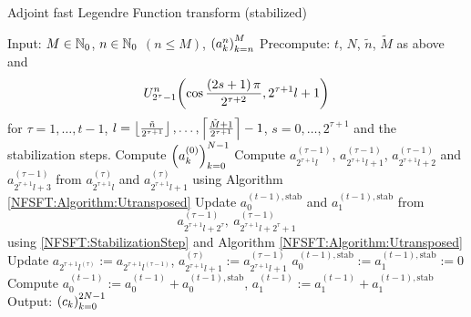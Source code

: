 \begin{algorithm}[tb]
  \caption{Adjoint fast Legendre Function transform (stabilized)}
  \label{NFSFT:Algorithm:adjointFLFT_stab}    
  \begin{algorithmic}
    \STATE Input:  $M \in \mathbb{N}_{0}$, $n \in \mathbb{N}_{0}$ $(n \le M)$, $\left(a_k^n\right)_{k=n}^{M}$
    \STATE Precompute: $t$, $N$, $\tilde{n}$, $\tilde{M}$ as above and \[U_{2^{\tau}-1}^{n}{\hspace{-0.4ex}}\left(\cos \frac{\left(2s+1\right)\pi}{2^{\tau+2}}, 2^{\tau+1}l+1\right)\] 
    \STATE {} for $\tau = 1,\ldots,t-1$, $l = \left\lfloor\frac{\tilde{n}}{2^{\tau+1}}\right\rfloor,\ldots,\left\lceil\frac{\tilde{M}+1}{2^{\tau+1}}\right\rceil-1$, 
    \STATE {} $s = 0,\ldots,2^{\tau+1}$ and the stabilization steps.
    \STATE Compute $\left(a_{k}^{(0)}\right)_{k=0}^{N-1}$ 
          \STATE Compute $a_{2^{\tau+1}l}^{(\tau-1)}$, $a_{2^{\tau+1}l+1}^{(\tau-1)}$, $a_{2^{\tau+1}l+2}^{(\tau-1)}$ and 
          $a_{2^{\tau+1}l+3}^{(\tau-1)}$ from $a_{2^{\tau+1}l}^{(\tau)}$ and $a_{2^{\tau+1}l+1}^{(\tau)}$ using 
          Algorithm \ref{NFSFT:Algorithm:Utransposed}
        \ELSE
          \STATE Update $a_{0}^{(t-1),\text{stab}}$ and $a_{1}^{(t-1),\text{stab}}$ from
            \[ 
              a_{2^{\tau+1}l+2^{\tau}}^{(\tau-1)},\ a_{2^{\tau+1}l+2^{\tau}+1}^{(\tau-1)}
            \] 
            using \eqref{NFSFT:StabilizationStep} and Algorithm \ref{NFSFT:Algorithm:Utransposed}
          \STATE Update $a_{2^{\tau+1}l^{(\tau)}} := a_{2^{\tau+1}l^{(\tau-1)}}$, $a_{2^{\tau+1}l+1}^{(\tau)} := a_{2^{\tau+1}l+1}^{(\tau-1)}$
        \ENDIF
      \ENDFOR
    \ENDFOR
    \STATE $a_{0}^{(t-1),\text{stab}} := a_{1}^{(t-1),\text{stab}} := 0$
    \STATE Compute $a_{0}^{(t-1)} := a_{0}^{(t-1)} + a_{0}^{(t-1),\text{stab}}$, $a_{1}^{(t-1)} := a_{1}^{(t-1)} + a_{1}^{(t-1),\text{stab}}$
    \STATE Output: $\left(c_{k}\right)_{k=0}^{2N-1}$
\end{algorithmic}
\end{algorithm}

